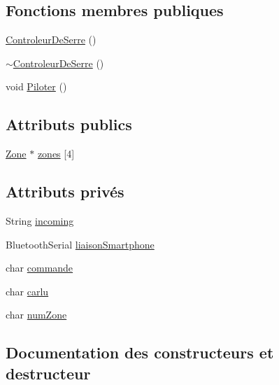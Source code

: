 \subsection*{Fonctions membres publiques}
\begin{DoxyCompactItemize}
\item 
\hyperlink{class_controleur_de_serre_afe055fb82c48b1c58575bba396d8d09f}{Controleur\+De\+Serre} ()
\item 
\hyperlink{class_controleur_de_serre_a657ac6eb145dacc226d9de1adaa9b2ab}{$\sim$\+Controleur\+De\+Serre} ()
\item 
void \hyperlink{class_controleur_de_serre_ab2b0f97cc39a24b330e214901f1c1323}{Piloter} ()
\end{DoxyCompactItemize}
\subsection*{Attributs publics}
\begin{DoxyCompactItemize}
\item 
\hyperlink{class_zone}{Zone} $\ast$ \hyperlink{class_controleur_de_serre_ad0cfc26f13ccea8cc304763caa32d3a5}{zones} \mbox{[}4\mbox{]}
\end{DoxyCompactItemize}
\subsection*{Attributs privés}
\begin{DoxyCompactItemize}
\item 
String \hyperlink{class_controleur_de_serre_aff14cbd8c5c61d76d592922ad81264d8}{incoming}
\item 
Bluetooth\+Serial \hyperlink{class_controleur_de_serre_a256aa95390c10b20876951613411372d}{liaison\+Smartphone}
\item 
char \hyperlink{class_controleur_de_serre_adfb41079ae94c40c8eaeb784b485c018}{commande}
\item 
char \hyperlink{class_controleur_de_serre_a193c19856f0c0b34cd405eabce6ddfab}{carlu}
\item 
char \hyperlink{class_controleur_de_serre_a743d1b27b4f77a807a199ef418a236d4}{num\+Zone}
\end{DoxyCompactItemize}


\subsection{Documentation des constructeurs et destructeur}
